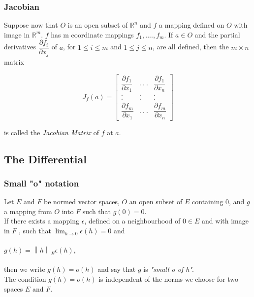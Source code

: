 \documentclass{beamer}
\newcommand{\R}{\mathbb{R}}
\newcommand\norm[1]{\left\lVert#1\right\rVert}
\begin{document}
\begin{frame}
\frametitle{Jacobian}

Suppose now that $O$ is an open subset of $\R^n$ and $f$ a mapping defined on $O$ with image in $\R^m$. $f$ has m coordinate mappings $f_1,...., f_m$. If $a \in O$ and the partial derivatives $\dfrac{\partial f_i}{\partial x_j} $ of $a$, for $1 \leq i \leq m$ and $1 \leq j \leq n$, are all defined, then the $m \times n $ matrix
\begin{center}
\[
J_f (a)=
  \begin{bmatrix}
    \dfrac{\partial f_1}{\partial x_1} & . ~ . ~ . & \dfrac{\partial f_1}{\partial x_n}  \\
    . & . & . \\
    . & . & . \\
    \dfrac{\partial f_m}{\partial x_1} & . ~ . ~ . & \dfrac{\partial f_m}{\partial x_n} 
  \end{bmatrix}
\]
\end{center}

is called the \textit{Jacobian Matrix} of $f$ at $a$.


\end{frame}





\subsection{The Differential}
\begin{frame}
\frametitle{Small "o" notation}
Let $E$ and $F$ be normed vector spaces, $O$ an open subset of $E$ containing 0, and $g$ a mapping from $O$ into $F$ such that $g(0) =  0$.\\ If there exists a mapping $\epsilon$, defined on a neighbourhood of $0 \in E$ and with image in $F$ , such that $\lim_{h \to 0} \epsilon(h) = 0$ and \\~\\
\hspace*{2cm} $g(h) = \norm{h}_E \epsilon(h)$,\\~\\
then we write $g(h) = o(h)$ and say that $g$ is \textit{"small o of h"}. \\

The condition $g(h) = o(h)$ is independent of the norms we choose for two spaces $E$ and $F$. \\

\end{frame}
\end{document}

